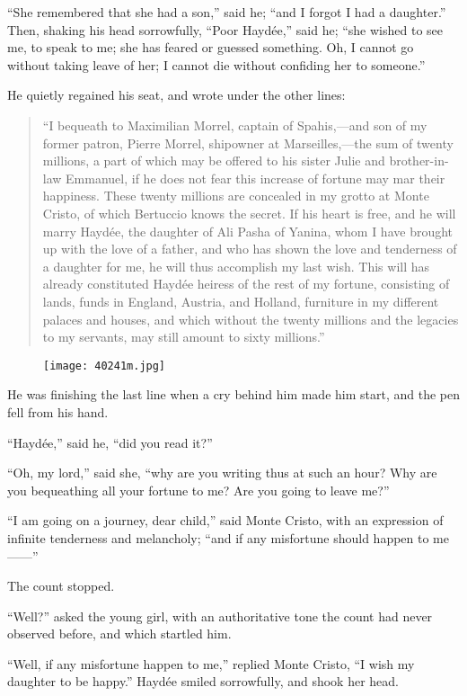 “She remembered that she had a son,” said he; “and I forgot I had a
daughter.” Then, shaking his head sorrowfully, “Poor Haydée,” said he;
“she wished to see me, to speak to me; she has feared or guessed
something. Oh, I cannot go without taking leave of her; I cannot die
without confiding her to someone.”

He quietly regained his seat, and wrote under the other lines:

\begin{quote}
{\small“I bequeath to Maximilian Morrel, captain of Spahis,—and son of my
former patron, Pierre Morrel, shipowner at Marseilles,—the sum of
twenty millions, a part of which may be offered to his sister Julie and
brother-in-law Emmanuel, if he does not fear this increase of fortune
may mar their happiness. These twenty millions are concealed in my
grotto at Monte Cristo, of which Bertuccio knows the secret. If his
heart is free, and he will marry Haydée, the daughter of Ali Pasha of
Yanina, whom I have brought up with the love of a father, and who has
shown the love and tenderness of a daughter for me, he will thus
accomplish my last wish. This will has already constituted Haydée
heiress of the rest of my fortune, consisting of lands, funds in
England, Austria, and Holland, furniture in my different palaces and
houses, and which without the twenty millions and the legacies to my
servants, may still amount to sixty millions.”}
\end{quote}

\begin{figure}[ht]
\texttt{[image: 40241m.jpg]}
\end{figure}

He was finishing the last line when a cry behind him made him start,
and the pen fell from his hand.

“Haydée,” said he, “did you read it?”

“Oh, my lord,” said she, “why are you writing thus at such an hour? Why
are you bequeathing all your fortune to me? Are you going to leave me?”

“I am going on a journey, dear child,” said Monte Cristo, with an
expression of infinite tenderness and melancholy; “and if any
misfortune should happen to me——”

The count stopped.

“Well?” asked the young girl, with an authoritative tone the count had
never observed before, and which startled him.

“Well, if any misfortune happen to me,” replied Monte Cristo, “I wish
my daughter to be happy.” Haydée smiled sorrowfully, and shook her
head.

